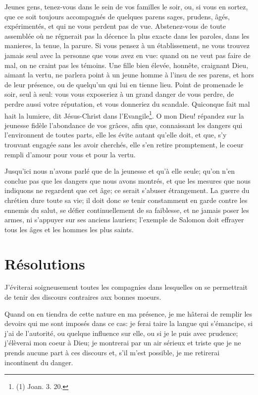 \documentclass[instructions.tex]{subfiles}
\begin{document}
Jeunes gens, tenez-vous dans le sein de vos familles le soir, ou, si vous en sortez, que ce soit toujours accompagnés de quelques parens sages, prudens, âgés, expérimentés, et qui ne vous perdent pas de vue. Abstenez-vous de toute assemblée où ne régnerait pas la décence la plus exacte dans les paroles, dans les manieres, la tenue, la parure. Si vous pensez à un établissement, ne vous trouvez jamais seul avec la personne que vous avez en vue: quand on ne veut pas faire de mal, on ne craint pas les témoins. Une fille bien élevée, honnête, craignant Dieu, aimant la vertu, ne parlera point à un jeune homme à l’insu de ses parens, et hors de leur présence, ou de quelqu’un qui lui en tienne lieu. Point de promenade le soir, seul à seul: vous vous exposeriez à un grand danger de vous perdre, de perdre aussi votre réputation, et vous donneriez du scandale. Quiconque fait mal hait la lumiere, dit Jésus-Christ dans l’Evangile\footnote{(1) Joan. 3. 20.}. O mon Dieu! répandez sur la jeunesse fidèle l’abondance de vos grâces, afin que, connaissant les dangers qui l’environnent de toutes parts, elle les évite autant qu’elle doit, et que, s’y trouvant engagée sans les avoir cherchés, elle s’en retire promptement, le coeur rempli d’amour pour vous et pour la vertu.

Jusqu’ici nous n’avons parlé que de la jeunesse et qu’à elle seule; qu’on n’en conclue pas que les dangers que nous avons montrés, et que les mesures que nous indiquons ne regardent que cet âge; ce serait s’abuser étrangement. La guerre du chrétien dure toute sa vie; il doit donc se tenir constamment en garde contre les ennemis du salut, se défier continuellement de sa faiblesse, et ne jamais poser les armes, ni s’appuyer sur ses anciens lauriers; l’exemple de Salomon doit effrayer tous les âges et les hommes les plus saints.
 
\section{Résolutions}
 
\primo J’éviterai soigneusement toutes les compagnies dans lesquelles on se permettrait de tenir des discours contraires aux bonnes moeurs.
 
\secundo Quand on en tiendra de cette nature en ma présence, je me hâterai de remplir les devoirs qui me sont imposés dans ce cas: je ferai taire la langue qui s’émancipe, si j’ai de l’autorité, ou quelque influence sur elle, ou si je le puis avec prudence; j’élèverai mon coeur à Dieu; je montrerai par un air sérieux et triste que je ne prends aucune part à ces discours et, s’il m’est possible, je me retirerai incontinent du danger. 

 
\end{document}

